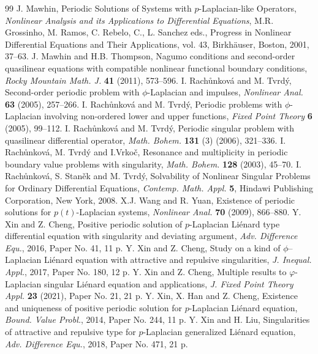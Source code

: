 \documentclass[11pt]{amsart}
\numberwithin{equation}{section} \textwidth=15.5cm
\begin{document}
\begin{thebibliography}{99}
\bibitem{[Maw01]} J. Mawhin, Periodic Solutions of Systems with $p$-Laplacian-like Operators, \textit{Nonlinear Analysis and its Applications to Differential Equations}, M.R. Grossinho, M. Ramos, C. Rebelo, C., L. Sanchez eds., Progress in Nonlinear Differential Equations and Their Applications, vol. 43, Birkh\"{a}user, Boston, 2001, 37--63.
\bibitem{[MaT2]} J. Mawhin and H.B. Thompson,  Nagumo conditions and second-order quasilinear equations with compatible nonlinear functional boundary conditions, {\em Rocky Mountain Math. J.} {\bf 41} (2011), 573--596.
\bibitem {[RaT1]} I. Rach\r{u}nkov\'{a} and M. Tvrd\'{y}, Second-order periodic problem with $\phi$-Laplacian and impulses, \textit{Nonlinear Anal.} {\bf 63} (2005), 257--266.
\bibitem{[RaT2]} I. Rach\r{u}nkov\'{a} and M. Tvrd\'{y}, Periodic problems with $\phi$-Laplacian involving non-ordered lower and upper functions, \textit{Fixed Point Theory} {\bf 6} (2005), 99--112.
\bibitem{[RaT3]} I. Rach\r{u}nkov\'{a} and M. Tvrd\'{y}, Periodic singular problem with quasilinear differential operator, \textit{Math. Bohem.} {\bf 131} (3) (2006), 321--336.
\bibitem{[RTV]} I. Rach\r{u}nkov\'{a}, M. Tvrd\'{y} and I.Vrko\v{c},  Resonance and multiplicity in periodic boundary value problems with singularity, \textit{Math. Bohem.} {\bf 128} (2003), 45--70.
\bibitem{[RaStTv]} I. Rach\r{u}nkov\'{a}, S. Stan\v{e}k and M. Tvrd\'{y}, Solvability of Nonlinear Singular Problems for Ordinary Differential Equations, \textit{Contemp. Math. Appl.} {\bf 5}, Hindawi Publishing Corporation,  New York, 2008.
\bibitem{[WaY]} X.J. Wang and R. Yuan, Existence of periodic solutions for $p(t)$-Laplacian systems, \textit{Nonlinear Anal.} {\bf  70} (2009), 866--880.
\bibitem{[XiC1]} Y. Xin and Z. Cheng, Positive periodic solution of $p$-Laplacian Li\'enard type differential equation with singularity and deviating argument, \textit{Adv. Difference Equ.}, 2016, Paper No. 41, 11 p.
\bibitem{[XiC2]} Y. Xin and Z. Cheng, Study on a kind of $\phi$--Laplacian Li\'enard equation with attractive and repulsive singularities, \textit{J. Inequal. Appl.}, 2017, Paper No. 180, 12 p.
\bibitem{[XiC3]} Y. Xin and Z. Cheng, Multiple results to $\varphi$-Laplacian singular Li\'enard equation and applications, \textit{J. Fixed Point Theory Appl.} {\bf 23} (2021), Paper No. 21, 21 p.
\bibitem{[XHC]} Y. Xin, X.  Han and Z. Cheng, Existence and uniqueness of positive periodic solution for $p$-Laplacian Li\'enard equation, \textit{Bound. Value Probl.}, 2014, Paper No. 244, 11 p.
\bibitem{[XiL]} Y. Xin and H. Liu, Singularities of attractive and repulsive type for $p$-Laplacian generalized Li\'enard equation, \textit{Adv. Difference Equ.}, 2018, Paper No. 471, 21 p.

\end{thebibliography}
\end{document}

